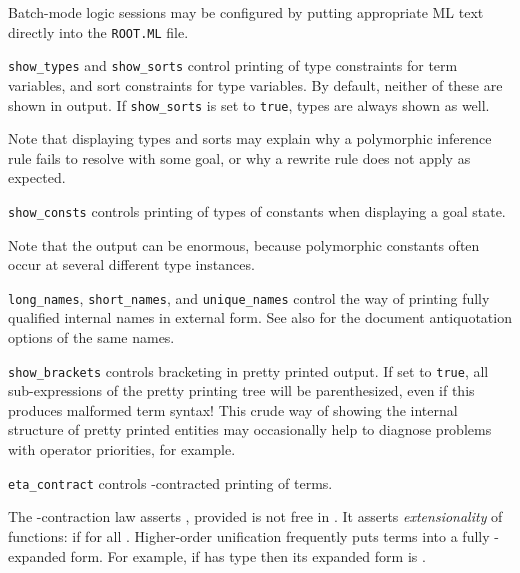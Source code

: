 \begin{isabellebody}
\begin{isamarkuptext}
  Batch-mode logic sessions may be configured by putting appropriate
  ML text directly into the \verb|ROOT.ML| file.

  \begin{description}

  \item \verb|show_types| and \verb|show_sorts| control printing of type
  constraints for term variables, and sort constraints for type
  variables.  By default, neither of these are shown in output.  If
  \verb|show_sorts| is set to \verb|true|, types are always shown as
  well.

  Note that displaying types and sorts may explain why a polymorphic
  inference rule fails to resolve with some goal, or why a rewrite
  rule does not apply as expected.

  \item \verb|show_consts| controls printing of types of constants when
  displaying a goal state.

  Note that the output can be enormous, because polymorphic constants
  often occur at several different type instances.

  \item \verb|long_names|, \verb|short_names|, and \verb|unique_names|
  control the way of printing fully qualified internal names in
  external form.  See also  for the document
  antiquotation options of the same names.

  \item \verb|show_brackets| controls bracketing in pretty printed
  output.  If set to \verb|true|, all sub-expressions of the pretty
  printing tree will be parenthesized, even if this produces malformed
  term syntax!  This crude way of showing the internal structure of
  pretty printed entities may occasionally help to diagnose problems
  with operator priorities, for example.

  \item \verb|eta_contract| controls \isa{{\isachardoublequote}{\isasymeta}{\isachardoublequote}}-contracted printing of
  terms.

  The \isa{{\isasymeta}}-contraction law asserts ,
  provided  is not free in .  It asserts
  \emph{extensionality} of functions:  if  for all .  Higher-order unification frequently puts
  terms into a fully \isa{{\isasymeta}}-expanded form.  For example, if  has type \isa{{\isachardoublequote}{\isacharparenleft}{\isasymtau}\ {\isasymRightarrow}\ {\isasymtau}{\isacharparenright}\ {\isasymRightarrow}\ {\isasymtau}{\isachardoublequote}} then its expanded form is .


\end{description}
\end{isamarkuptext}
\end{isabellebody}
